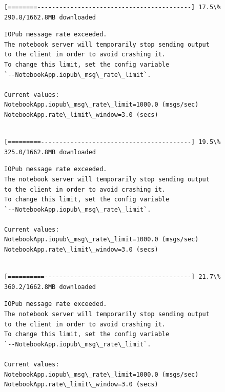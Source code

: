 \documentclass[11pt]{article}
\begin{document}
    \begin{Verbatim}[commandchars=\\\{\}]
[========------------------------------------------] 17.5\% 290.8/1662.8MB downloaded
    \end{Verbatim}

    \begin{Verbatim}[commandchars=\\\{\}]
IOPub message rate exceeded.
The notebook server will temporarily stop sending output
to the client in order to avoid crashing it.
To change this limit, set the config variable
`--NotebookApp.iopub\_msg\_rate\_limit`.

Current values:
NotebookApp.iopub\_msg\_rate\_limit=1000.0 (msgs/sec)
NotebookApp.rate\_limit\_window=3.0 (secs)


    \end{Verbatim}

    \begin{Verbatim}[commandchars=\\\{\}]
[=========-----------------------------------------] 19.5\% 325.0/1662.8MB downloaded
    \end{Verbatim}

    \begin{Verbatim}[commandchars=\\\{\}]
IOPub message rate exceeded.
The notebook server will temporarily stop sending output
to the client in order to avoid crashing it.
To change this limit, set the config variable
`--NotebookApp.iopub\_msg\_rate\_limit`.

Current values:
NotebookApp.iopub\_msg\_rate\_limit=1000.0 (msgs/sec)
NotebookApp.rate\_limit\_window=3.0 (secs)


    \end{Verbatim}

    \begin{Verbatim}[commandchars=\\\{\}]
[==========----------------------------------------] 21.7\% 360.2/1662.8MB downloaded
    \end{Verbatim}

    \begin{Verbatim}[commandchars=\\\{\}]
IOPub message rate exceeded.
The notebook server will temporarily stop sending output
to the client in order to avoid crashing it.
To change this limit, set the config variable
`--NotebookApp.iopub\_msg\_rate\_limit`.

Current values:
NotebookApp.iopub\_msg\_rate\_limit=1000.0 (msgs/sec)
NotebookApp.rate\_limit\_window=3.0 (secs)


    \end{Verbatim}
\end{document}
